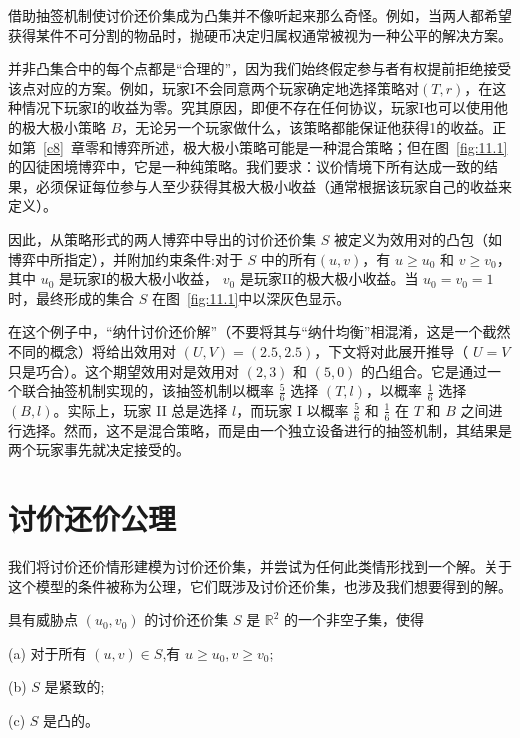 借助抽签机制使讨价还价集成为凸集并不像听起来那么奇怪。例如，当两人都希望获得某件不可分割的物品时，抛硬币决定归属权通常被视为一种公平的解决方案。

并非凸集合中的每个点都是“合理的”，因为我们始终假定参与者有权提前拒绝接受该点对应的方案。例如，玩家I不会同意两个玩家确定地选择策略对$(T,r)$，在这种情况下玩家I的收益为零。究其原因，即便不存在任何协议，玩家I也可以使用他的极大极小策略 \(B\)，无论另一个玩家做什么，该策略都能保证他获得1的收益。正如第~\ref{c8}~章零和博弈所述，极大极小策略可能是一种混合策略；但在图~\ref{fig:11.1}的囚徒困境博弈中，它是一种纯策略。我们要求：议价情境下所有达成一致的结果，必须保证每位参与人至少获得其极大极小收益（通常根据该玩家自己的收益来定义）。

因此，从策略形式的两人博弈中导出的讨价还价集 \(S\) 被定义为效用对的凸包（如博弈中所指定），并附加约束条件:对于 \(S\) 中的所有$(u,v)$，有 \(u \geq  {u}_{0}\) 和 \(v \geq  {v}_{0}\)，其中 \({u}_{0}\) 是玩家I的极大极小收益， \({v}_{0}\) 是玩家II的极大极小收益。当 \({u}_{0} = {v}_{0} = 1\)时，最终形成的集合 \(S\) 在图~\ref{fig:11.1}中以深灰色显示。

在这个例子中，“纳什讨价还价解”（不要将其与“纳什均衡”相混淆，这是一个截然不同的概念）将给出效用对 \(\left( {U,V}\right)  = \left( {{2.5},{2.5}}\right)\)，下文将对此展开推导（ \(U = V\) 只是巧合）。这个期望效用对是效用对 $(2,3)$ 和 $(5,0)$ 的凸组合。它是通过一个联合抽签机制实现的，该抽签机制以概率 \(\frac{5}{6}\) 选择 $(T,l)$，以概率 \(\frac{1}{6}\) 选择 $(B,l)$。实际上，玩家 II 总是选择 \(l\)，而玩家 I 以概率 \(\frac{5}{6}\) 和 \(\frac{1}{6}\) 在 \(T\) 和 \(B\) 之间进行选择。然而，这不是混合策略，而是由一个独立设备进行的抽签机制，其结果是两个玩家事先就决定接受的。



\section{讨价还价公理}\label{sec11.3}

我们将讨价还价情形建模为讨价还价集，并尝试为任何此类情形找到一个解。关于这个模型的条件被称为公理，它们既涉及讨价还价集，也涉及我们想要得到的解。

\begin{definition}[讨价还价集的公理]\label{def:11.1}
具有威胁点 \(\left( {{u}_{0},{v}_{0}}\right)\) 的讨价还价集 \(S\) 是 \({\mathbb{R}}^{2}\) 的一个非空子集，使得

(a) 对于所有 \(\left( {u,v}\right)  \in  S\),有 \(u \geq  {u}_{0},v \geq  {v}_{0}\);

(b) \(S\) 是紧致的;

(c) \(S\) 是凸的。
\end{definition}


